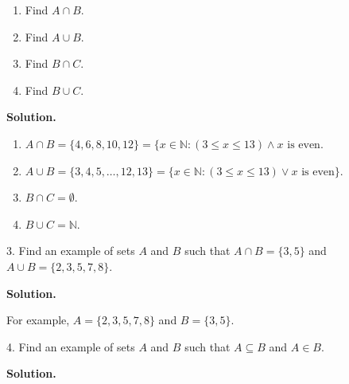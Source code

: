 \documentclass[10pt,]{book}
\theoremstyle{plain}
\theoremstyle{definition}
\theoremstyle{definition}
\theoremstyle{definition}
\def\N{\mathbb N}
\def\st{:}
\begin{document}
\begin{exerciselist}
\begin{enumerate}[label=(\alph*)]
\item\hypertarget{li-242}{} Find \(A \cap B\). %
\item\hypertarget{li-243}{} Find \(A \cup B\). %
\item\hypertarget{li-244}{} Find \(B \cap C\). %
\item\hypertarget{li-245}{} Find \(B \cup C\). %
\end{enumerate}
\par\smallskip
\par\smallskip
\noindent\textbf{Solution.}\hypertarget{solution-24}{}\quad
\leavevmode%
\begin{enumerate}[label=(\alph*)]
\item\hypertarget{li-246}{}\(A \cap B = \{4,6,8,10,12\} = \{x \in \N \st (3 \le x \le 13) \wedge x \mbox{ is even}\).\item\hypertarget{li-247}{}\(A \cup B = \{3, 4, 5, \ldots, 12, 13\} = \{x \in \N \st (3 \le x \le 13) \vee x \mbox{ is even} \}\). \item\hypertarget{li-248}{}\(B \cap C = \emptyset\).\item\hypertarget{li-249}{}\(B \cup C = \N\).\end{enumerate}
\item[3.]\hypertarget{exercise-13}{}
          Find an example of sets \(A\) and \(B\) such that \(A\cap B = \{3, 5\}\) and \(A \cup B = \{2, 3, 5, 7, 8\}\).
\par\smallskip
\par\smallskip
\noindent\textbf{Solution.}\hypertarget{solution-25}{}\quad

          For example, \(A = \{2,3,5,7,8\}\) and \(B = \{3,5\}\).
\item[4.]\hypertarget{exercise-14}{}
          Find an example of sets \(A\) and \(B\) such that \(A \subseteq B\) and \(A \in B\).
\par\smallskip
\par\smallskip
\noindent\textbf{Solution.}\hypertarget{solution-26}{}\quad


\end{exerciselist}
\end{document}
